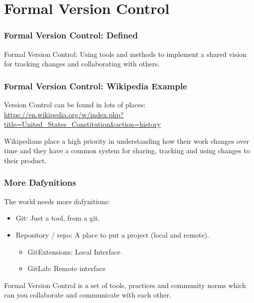 \documentclass{beamer}
\begin{document}
\section{Formal Version Control} %

\begin{frame} %
  \frametitle{Formal Version Control: Defined}

  Formal Version Control: Using tools and methods to implement a
  shared vision for tracking changes and collaborating with others.
  
 \end{frame}
 
\begin{frame} %
  \frametitle{Formal Version Control: Wikipedia Example}

  Version Control can be found in lots of places:\\
  
  \smallskip
  {\tiny{\url{https://en.wikipedia.org/w/index.php?title=United\_States\_Constitution\&action=history}}}

  \bigskip
  Wikipedians place a high priority in understanding how their work
  changes over time and they have a common system for sharing,
  tracking and using changes to their product.

\end{frame}

\begin{frame} %
  \frametitle{More Dafynitions}

  The world needs more dafynitions:
  
  \begin{itemize}
  \item Git: Just a tool, from a git.
  \item Repository / repo: A place to put a project (local and
    remote).
    \begin{itemize}
    \item GitExtensions: Local Interface
    \item GitLab: Remote interface
    \end{itemize}
  \end{itemize}

  \bigskip
  Formal Version Control is a set of tools, practices and community
  norms which can you collaborate and communicate with each
  other.
  
\end{frame}
\end{document}

